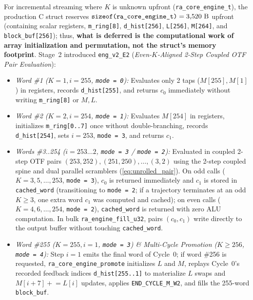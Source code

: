\documentclass[conference]{IEEEtran}
\begin{document}
For incremental streaming where $K$ is unknown upfront (\texttt{ra\_core\_engine\_t}), the production C struct reserves $\text{\texttt{sizeof(ra\_core\_engine\_t)}} = 3{,}520\text{ B}$ upfront (containing scalar registers, \texttt{m\_ring[8]}, \texttt{d\_hist[256]}, \texttt{L[256]}, \texttt{M[264]}, and \texttt{block\_buf[256]}); thus, \textbf{what is deferred is the computational work of array initialization and permutation, not the struct's memory footprint}. Stage~2 introduced \texttt{eng\_v2\_E2} (\emph{Even-$K$-Aligned 2-Step Coupled OTF Pair Evaluation}):
\begin{itemize}
    \item \emph{Word \#1 ($K=1, i=255$, \texttt{mode = 0}):} Evaluates only 2 taps ($M[255], M[1]$) in registers, records \texttt{d\_hist[255]}, and returns $c_0$ immediately without writing \texttt{m\_ring[8]} or $M, L$.
    \item \emph{Word \#2 ($K=2, i=254$, \texttt{mode = 1}):} Evaluates $M[254]$ in registers, initializes \texttt{m\_ring[0..7]} once without double-branching, records \texttt{d\_hist[254]}, sets $i = 253$, \texttt{mode = 3}, and returns $c_1$.
    \item \emph{Words \#3..254 ($i=253\ldots 2$, \texttt{mode = 3} / \texttt{mode = 2}):} Evaluated in coupled 2-step OTF pairs $(253, 252), (251, 250), \dots, (3, 2)$ using the 2-step coupled spine and dual parallel scramblers (\ref{eq:unrolled_pair}). On odd calls ($K=3, 5, \dots, 253$, \texttt{mode = 3}), $c_0$ is returned immediately and $c_1$ is stored in \texttt{cached\_word} (transitioning to \texttt{mode = 2}; if a trajectory terminates at an odd $K \ge 3$, one extra word $c_1$ was computed and cached); on even calls ($K=4, 6, \dots, 254$, \texttt{mode = 2}), \texttt{cached\_word} is returned with zero ALU computation. In bulk \texttt{ra\_engine\_fill\_u32}, pairs $(c_0, c_1)$ write directly to the output buffer without touching \texttt{cached\_word}.
    \item \emph{Word \#255 ($K=255, i=1$, \texttt{mode = 3}) \& Multi-Cycle Promotion ($K \ge 256$, \texttt{mode = 4}):} Step $i=1$ emits the final word of Cycle~0; if word \#256 is requested, \texttt{ra\_core\_engine\_promote} initializes $L$ and $M$, replays Cycle~0's recorded feedback indices \texttt{d\_hist[255..1]} to materialize $L$ swaps and $M[i+7] \mathrel{+}= L[i]$ updates, applies \texttt{END\_CYCLE\_M\_W2}, and fills the 255-word \texttt{block\_buf}.
\end{itemize}
\end{document}
